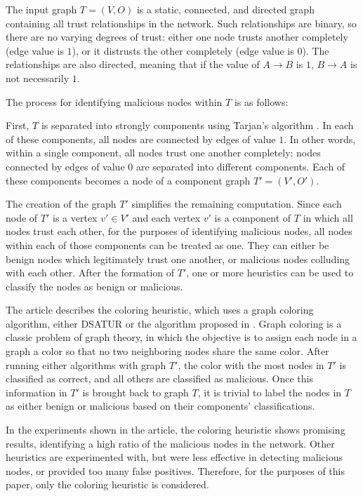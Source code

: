 The input graph $T = (V,O)$ is a static, connected, and directed graph containing all trust relationships in the network.
Such relationships are binary, so there are no varying degrees of trust: either one node trusts another completely (edge value is $1$), or it distrusts the other completely (edge value is $0$).
The relationships are also directed, meaning that if the value of $A\rightarrow B$ is $1$, $B\rightarrow A$ is not necessarily $1$.

The process for identifying malicious nodes within $T$ is as follows:

First, $T$ is separated into strongly components using Tarjan's algorithm \cite{tarjan1972depth}.
In each of these components, all nodes are connected by edges of value $1$.
In other words, within a single component, all nodes trust one another completely; nodes connected by edges of value $0$ are separated into different components.
Each of these components becomes a node of a component graph $T' = (V', O')$.

The creation of the graph $T'$ simplifies the remaining computation.
Since each node of $T'$ is a vertex $v' \in V'$ and each vertex $v'$ is a component of $T$ in which all nodes trust each other, for the purposes of identifying malicious nodes, all nodes within each of those components can be treated as one.
They can either be benign nodes which legitimately trust one another, or malicious nodes colluding with each other.
After the formation of $T'$, one or more heuristics can be used to classify the nodes as benign or malicious.

The article describes the coloring heuristic, which uses a graph coloring algorithm, either DSATUR \cite{brelaz1979new} or the algorithm proposed in \cite{mittal2011graph}.
Graph coloring is a classic problem of graph theory, in which the objective is to assign each node in a graph a color so that no two neighboring nodes share the same color.
After running either algorithms with graph $T'$, the color with the most nodes in $T'$ is classified as correct, and all others are classified as malicious.
Once this information in $T'$ is brought back to graph $T$, it is trivial to label the nodes in $T$ as either benign or malicious based on their components' classifications.

In the experiments shown in the article, the coloring heuristic shows promising results, identifying a high ratio of the malicious nodes in the network.
Other heuristics are experimented with, but were less effective in detecting malicious nodes, or provided too many false positives.
Therefore, for the purposes of this paper, only the coloring heuristic is considered.

